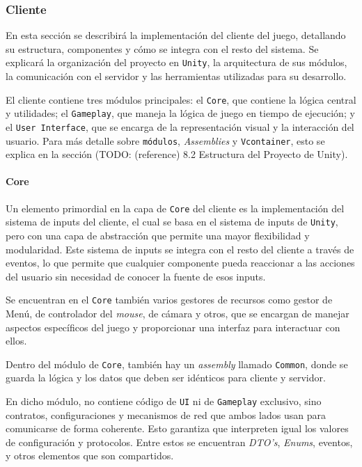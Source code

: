 \subsubsection{Cliente}

En esta sección se describirá la implementación del cliente del juego, detallando su estructura, componentes 
y cómo se integra con el resto del sistema. Se explicará la organización del proyecto en \texttt{Unity}, la 
arquitectura de sus módulos, la comunicación con el servidor y las herramientas utilizadas para su desarrollo.

El cliente contiene tres módulos principales: el \texttt{Core}, que contiene la lógica central y utilidades; 
el \texttt{Gameplay}, que maneja la lógica de juego en tiempo de ejecución; y el \texttt{User Interface}, 
que se encarga de la representación visual y la interacción del usuario. Para más detalle sobre \texttt{módulos}, 
\textit{Assemblies} y \texttt{Vcontainer}, esto se explica en la sección 
(TODO: (reference) 8.2 Estructura del Proyecto de Unity). 

\paragraph{Core}

Un elemento primordial en la capa de \texttt{Core} del cliente es la implementación del sistema de inputs del cliente, 
el cual se basa en el sistema de inputs de \texttt{Unity}, pero con una capa de abstracción que permite una mayor 
flexibilidad y modularidad. Este sistema de inputs se integra con el resto del cliente a través de eventos, 
lo que permite que cualquier componente pueda reaccionar a las acciones del usuario sin necesidad de conocer 
la fuente de esos inputs.

Se encuentran en el \texttt{Core} también varios gestores de recursos como gestor de Menú, de controlador del 
\textit{mouse}, de cámara y otros, que se encargan de manejar aspectos específicos del juego y proporcionar una 
interfaz para interactuar con ellos.

\vspace{0.20cm}

Dentro del módulo de \texttt{Core}, también hay un \textit{assembly} llamado \texttt{Common}, donde se guarda 
la lógica y los datos que deben ser idénticos para cliente y servidor. 

En dicho módulo, no contiene código de \texttt{UI} ni de \texttt{Gameplay} exclusivo, sino contratos, 
configuraciones y mecanismos de red que ambos lados usan para comunicarse de forma coherente. 
Esto garantiza que interpreten igual los valores de configuración y protocolos. 
Entre estos se encuentran \textit{DTO's}, \textit{Enums}, eventos, y otros elementos que son compartidos. 

